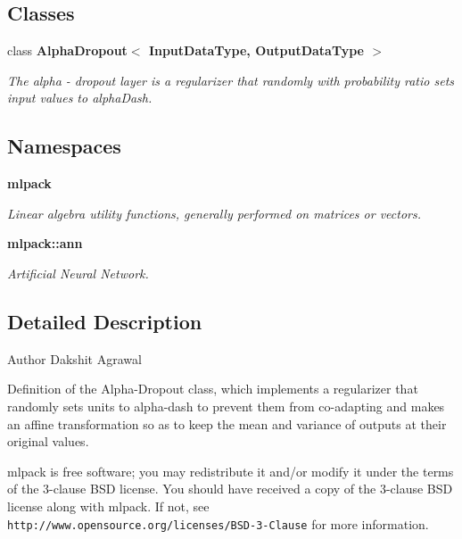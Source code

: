 \subsection*{Classes}
\begin{DoxyCompactItemize}
\item 
class \textbf{ Alpha\+Dropout$<$ Input\+Data\+Type, Output\+Data\+Type $>$}
\begin{DoxyCompactList}\small\item\em The alpha -\/ dropout layer is a regularizer that randomly with probability \textquotesingle{}ratio\textquotesingle{} sets input values to alpha\+Dash. \end{DoxyCompactList}\end{DoxyCompactItemize}
\subsection*{Namespaces}
\begin{DoxyCompactItemize}
\item 
 \textbf{ mlpack}
\begin{DoxyCompactList}\small\item\em Linear algebra utility functions, generally performed on matrices or vectors. \end{DoxyCompactList}\item 
 \textbf{ mlpack\+::ann}
\begin{DoxyCompactList}\small\item\em Artificial Neural Network. \end{DoxyCompactList}\end{DoxyCompactItemize}


\subsection{Detailed Description}
\begin{DoxyAuthor}{Author}
Dakshit Agrawal
\end{DoxyAuthor}
Definition of the Alpha-\/\+Dropout class, which implements a regularizer that randomly sets units to alpha-\/dash to prevent them from co-\/adapting and makes an affine transformation so as to keep the mean and variance of outputs at their original values.

mlpack is free software; you may redistribute it and/or modify it under the terms of the 3-\/clause B\+SD license. You should have received a copy of the 3-\/clause B\+SD license along with mlpack. If not, see {\tt http\+://www.\+opensource.\+org/licenses/\+B\+S\+D-\/3-\/\+Clause} for more information. 